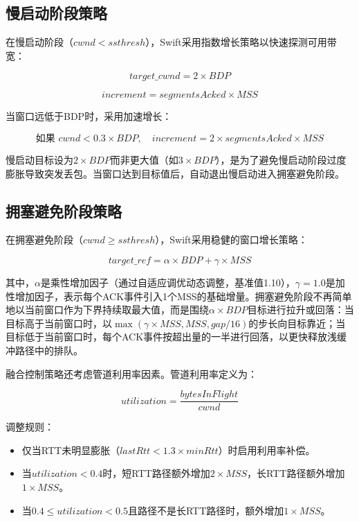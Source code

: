\subsection{慢启动阶段策略}

在慢启动阶段（$cwnd < ssthresh$），Swift采用指数增长策略以快速探测可用带宽：

\begin{equation}
target\_cwnd = 2 \times BDP
\end{equation}

\begin{equation}
increment = segmentsAcked \times MSS
\end{equation}

当窗口远低于BDP时，采用加速增长：

\begin{equation}
\text{如果~} cwnd < 0.3 \times BDP, \quad increment = 2 \times segmentsAcked \times MSS
\end{equation}

慢启动目标设为$2 \times BDP$而非更大值（如$3 \times BDP$），是为了避免慢启动阶段过度膨胀导致突发丢包。当窗口达到目标值后，自动退出慢启动进入拥塞避免阶段。

\subsection{拥塞避免阶段策略}

在拥塞避免阶段（$cwnd \geq ssthresh$），Swift采用稳健的窗口增长策略：

\begin{equation}
target\_ref = \alpha \times BDP + \gamma \times MSS
\end{equation}

其中，$\alpha$是乘性增加因子（通过自适应调优动态调整，基准值1.10），$\gamma = 1.0$是加性增加因子，表示每个ACK事件引入1个MSS的基础增量。拥塞避免阶段不再简单地以当前窗口作为下界持续取最大值，而是围绕$\alpha \times BDP$目标进行拉升或回落：当目标高于当前窗口时，以$\max(\gamma \times MSS, MSS, gap/16)$的步长向目标靠近；当目标低于当前窗口时，每个ACK事件按超出量的一半进行回落，以更快释放浅缓冲路径中的排队。

融合控制策略还考虑管道利用率因素。管道利用率定义为：

\begin{equation}
utilization = \frac{bytesInFlight}{cwnd}
\end{equation}

调整规则：
\begin{itemize}
    \item 仅当RTT未明显膨胀（$lastRtt < 1.3 \times minRtt$）时启用利用率补偿。
    \item 当$utilization < 0.4$时，短RTT路径额外增加$2 \times MSS$，长RTT路径额外增加$1 \times MSS$。
    \item 当$0.4 \leq utilization < 0.5$且路径不是长RTT路径时，额外增加$1 \times MSS$。
\end{itemize}

